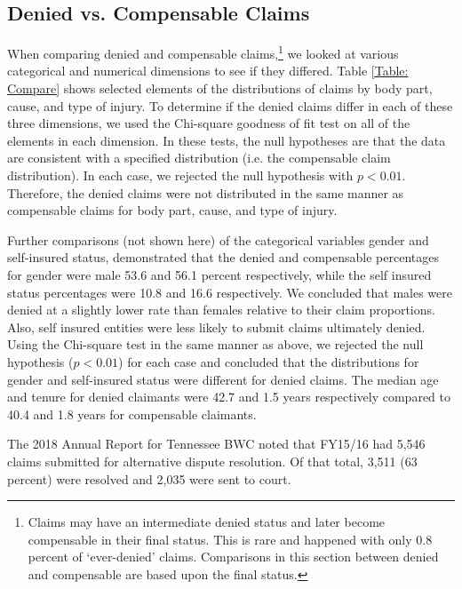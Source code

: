 \documentclass[9pt, oneside]{article}   	%
\begin{document}
  
  
  
  \subsection{Denied vs. Compensable Claims}
  
  
When comparing denied and compensable claims,\footnote{Claims may have an intermediate denied status and later become compensable in their final status. This is rare and happened with only 0.8 percent of `ever-denied' claims. Comparisons in this section between denied and compensable are based upon the final status.} we looked at various categorical and numerical dimensions to see if they differed. Table \ref{Table: Compare} shows selected elements of the distributions of claims by body part, cause, and type of injury. To determine if the denied claims differ in each of these three dimensions, we used the Chi-square goodness of fit test on all of the elements in each dimension. In these tests, the null hypotheses are that the data are consistent with a specified distribution (i.e. the compensable claim distribution). In each case, we rejected the null hypothesis with $p < 0.01$. Therefore, the denied claims were not distributed in the same manner as compensable claims for body part, cause, and type of injury. 

Further comparisons (not shown here) of the categorical variables gender and self-insured status, demonstrated that the denied and compensable percentages for gender were male 53.6 and 56.1 percent respectively, while the self insured status percentages were 10.8 and 16.6 respectively.  We concluded that males were denied at a slightly lower rate than females relative to their claim proportions. Also, self insured entities were less likely to submit claims ultimately denied. Using the Chi-square test in the same manner as above, we rejected the null hypothesis ($p < 0.01$) for each case and concluded that the distributions for gender and self-insured status were different for denied claims. The median age and tenure for denied claimants  were 42.7 and 1.5 years respectively compared to 40.4 and 1.8 years for compensable claimants.

The 2018 Annual Report for Tennessee BWC noted that FY15/16 had 5,546 claims submitted for alternative dispute resolution. Of that total, 3,511 (63 percent) were resolved and 2,035 were sent to court.
  
\end{document}
